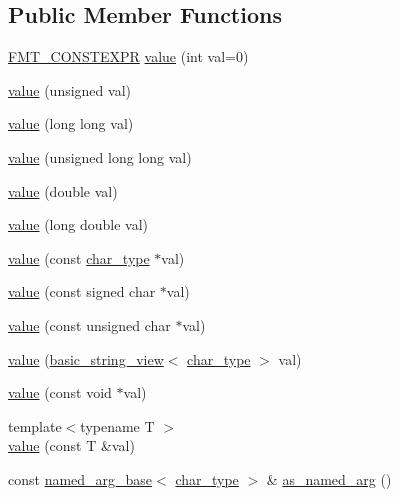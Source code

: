 \subsection*{Public Member Functions}
\begin{DoxyCompactItemize}
\item 
\hyperlink{core_8h_a69201cb276383873487bf68b4ef8b4cd}{F\+M\+T\+\_\+\+C\+O\+N\+S\+T\+E\+X\+PR} \hyperlink{classinternal_1_1value_a59a76211dd5b2b104ea8bb58d81a975d}{value} (int val=0)
\item 
\hyperlink{classinternal_1_1value_a075792e814700f12afee1e03d474c6bf}{value} (unsigned val)
\item 
\hyperlink{classinternal_1_1value_ad92f045a90d011f8d17fb7a334bb60b5}{value} (long long val)
\item 
\hyperlink{classinternal_1_1value_ab420aaab876f731accbffb6e16dd92c2}{value} (unsigned long long val)
\item 
\hyperlink{classinternal_1_1value_a778e55733b3f38997f673392134cf4c7}{value} (double val)
\item 
\hyperlink{classinternal_1_1value_a1f7f8ae55402f1722f6187ec83b82b1a}{value} (long double val)
\item 
\hyperlink{classinternal_1_1value_a6c49de972ba65b5f001650621e0f1f0e}{value} (const \hyperlink{classinternal_1_1value_aea7e71c59ab9961b645ed79e69aff80e}{char\+\_\+type} $\ast$val)
\item 
\hyperlink{classinternal_1_1value_ab2d0b55a212e07e485aca05295b0dc21}{value} (const signed char $\ast$val)
\item 
\hyperlink{classinternal_1_1value_a38443f7879cabf02519ef40f53c4a5a8}{value} (const unsigned char $\ast$val)
\item 
\hyperlink{classinternal_1_1value_adeb52dcf1b9767046e11899cf6a812ec}{value} (\hyperlink{classbasic__string__view}{basic\+\_\+string\+\_\+view}$<$ \hyperlink{classinternal_1_1value_aea7e71c59ab9961b645ed79e69aff80e}{char\+\_\+type} $>$ val)
\item 
\hyperlink{classinternal_1_1value_acf3509a16c38533d3fc583086b73505e}{value} (const void $\ast$val)
\item 
{\footnotesize template$<$typename T $>$ }\\\hyperlink{classinternal_1_1value_ae8ae97a2e4fe75ae2916044362bf7319}{value} (const T \&val)
\item 
const \hyperlink{structinternal_1_1named__arg__base}{named\+\_\+arg\+\_\+base}$<$ \hyperlink{classinternal_1_1value_aea7e71c59ab9961b645ed79e69aff80e}{char\+\_\+type} $>$ \& \hyperlink{classinternal_1_1value_a071197c0d0a2e48940fac7a961587850}{as\+\_\+named\+\_\+arg} ()
\end{DoxyCompactItemize}

